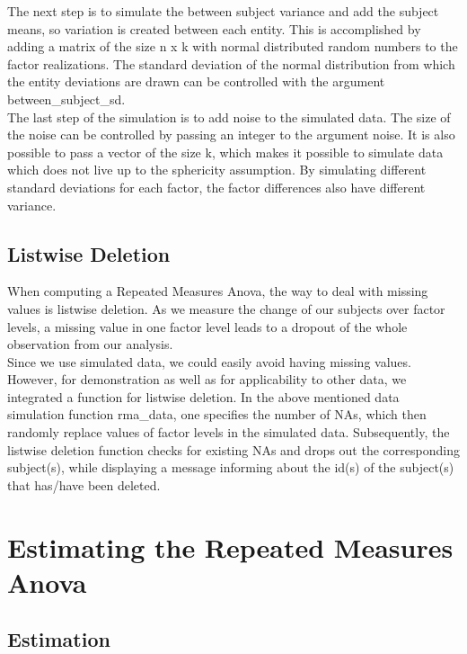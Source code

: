 \documentclass[11pt]{article}
\begin{document}
				 The next step is to simulate the between subject variance and add the subject means, so variation is created between each entity. This is accomplished by adding a matrix of the size n x k with normal distributed random numbers to the factor realizations. The standard deviation of the normal distribution from which the entity deviations are drawn can be controlled with the argument between\_subject\_sd. \\
				 
				 The last step  of the simulation is to add noise to the simulated data. The size of the noise can be controlled by passing an integer to the argument noise. It is also possible to pass a vector of the size k, which makes it possible to simulate data which does not live up to the sphericity assumption. By simulating different standard deviations for each factor, the factor differences also have different variance.
				 
		\subsection{Listwise Deletion}
				 When computing a Repeated Measures Anova, the way to deal with missing values is listwise deletion. As we measure the change of our subjects over factor levels, a missing value in one factor level leads to a dropout of the whole observation from our analysis.\\
				
				Since we use simulated data, we could easily avoid having missing values. However, for demonstration as well as for applicability to other data, we integrated a function for listwise deletion. In the above mentioned data simulation function rma\_data, one specifies the number of NAs, which then randomly replace values of factor levels in the simulated data. Subsequently, the listwise deletion function checks for existing NAs and drops out the corresponding subject(s), while displaying a message informing about the id(s) of the subject(s) that has/have been deleted.
				 
	
			
				
	\section{Estimating the Repeated Measures Anova} 
		\subsection{Estimation}
	
\end{document}
